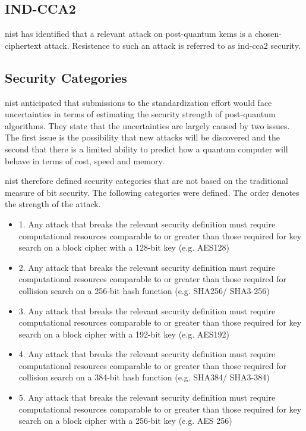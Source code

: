 \subsection{IND-CCA2}

\gls{nist} has identified that a relevant attack on post-quantum \glspl{kem} is a chosen-ciphertext attack. Resistence to such an attack is referred to as \gls{ind-cca2} security\cite{nist2017}.

\subsection{Security Categories}

\gls{nist} anticipated that submissions to the standardization effort would face uncertainties in terms of estimating the security strength of post-quantum algorithms. They state that the uncertainties are largely caused by two issues. The first issue is the possibility that new attacks will be discovered and the second that there is a limited ability to predict how a quantum computer will behave in terms of cost, speed and memory\cite{nist2017}.

\gls{nist} therefore defined security categories that are not based on the traditional measure of bit security. The following categories were defined. The order denotes the strength of the attack\cite{nist2017}.

\begin{itemize}
    \item 1. Any attack that breaks the relevant security definition must require computational resources comparable to or greater than those required for key search on a block cipher with a 128-bit key (e.g. AES128)
    \item 2. Any attack that breaks the relevant security definition must require computational resources comparable to or greater than those required for collision search on a 256-bit hash function (e.g. SHA256/ SHA3-256)
    \item 3. Any attack that breaks the relevant security definition must require computational resources comparable to or greater than those required for key search on a block cipher with a 192-bit key (e.g. AES192)
    \item 4. Any attack that breaks the relevant security definition must require computational resources comparable to or greater than those required for collision search on a 384-bit hash function (e.g. SHA384/ SHA3-384)
    \item 5. Any attack that breaks the relevant security definition must require computational resources comparable to or greater than those required for key search on a block cipher with a 256-bit key (e.g. AES 256)
\end{itemize}


